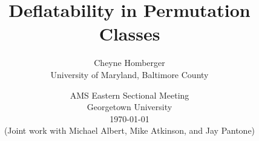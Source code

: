 \documentclass[xcolor=table,dvipsnames]{beamer}
\renewcommand{\S}{\mathfrak{S}}
\begin{document}
\title[Deflatability]%
  {\Large \rm Deflatability in Permutation Classes}

\author{Cheyne Homberger \\ {\small University of Maryland, Baltimore County}}

\date{\small AMS Eastern Sectional Meeting \\ 
        Georgetown University \\ 
        \today \\[2pc]
        (Joint work with Michael Albert, Mike Atkinson, and Jay Pantone)
  }


\begin{frame}
  \titlepage
\end{frame}




% 
% 
\end{document}
